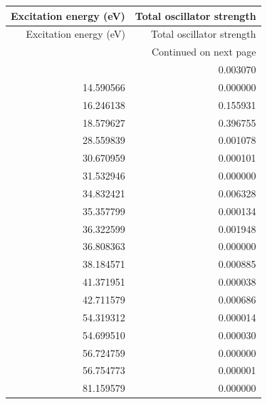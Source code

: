 \begin{longtable}{rr}
\toprule
Excitation energy (eV) & Total oscillator strength \\
\midrule
\endfirsthead
\toprule
Excitation energy (eV) & Total oscillator strength \\
\midrule
\endhead
\midrule
\multicolumn{2}{r}{Continued on next page} \\
\midrule
\endfoot
\bottomrule
\endlastfoot
12.288763 & 0.003070 \\
14.590566 & 0.000000 \\
16.246138 & 0.155931 \\
18.579627 & 0.396755 \\
28.559839 & 0.001078 \\
30.670959 & 0.000101 \\
31.532946 & 0.000000 \\
34.832421 & 0.006328 \\
35.357799 & 0.000134 \\
36.322599 & 0.001948 \\
36.808363 & 0.000000 \\
38.184571 & 0.000885 \\
41.371951 & 0.000038 \\
42.711579 & 0.000686 \\
54.319312 & 0.000014 \\
54.699510 & 0.000030 \\
56.724759 & 0.000000 \\
56.754773 & 0.000001 \\
81.159579 & 0.000000 \\
\end{longtable}
